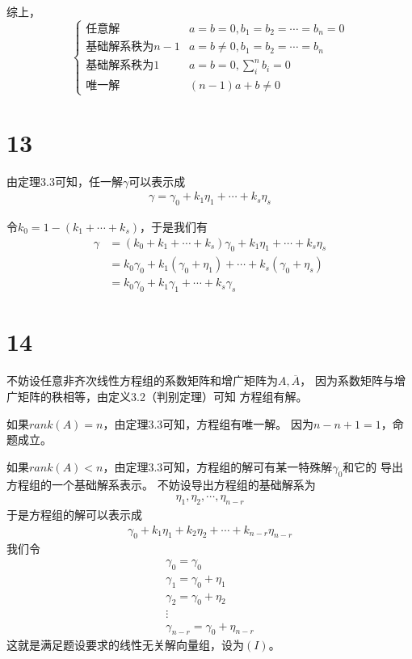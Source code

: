 \documentclass{article}
\begin{document}
综上，
\begin{equation*}
  \begin{cases}
    \text{任意解}           & a = b = 0, b_1 = b_2 =\cdots = b_n = 0 \\
    \text{基础解系秩为$n - 1$} & a = b \neq 0, b_1 = b_2 =\cdots = b_n  \\
    \text{基础解系秩为$1$}     & a = b = 0, \sum\limits_{i}^n b_i = 0   \\
    \text{唯一解}           & (n - 1)a + b \neq 0
  \end{cases}
\end{equation*}

\section*{13}
由定理3.3可知，任一解$\gamma$可以表示成
\begin{align*}
  \gamma = \gamma_0 + k_1\eta_1 + \cdots + k_s\eta_s
\end{align*}

令$k_0 = 1 - (k_1 + \cdots + k_s)$，于是我们有
\begin{align*}
  \gamma
   & = (k_0 + k_1 + \cdots + k_s) \gamma_0 + k_1 \eta_1 + \cdots + k_s \eta_s    \\
   & = k_0 \gamma_0 + k_1 (\gamma_0 + \eta_1) + \cdots + k_s (\gamma_0 + \eta_s) \\
   & = k_0 \gamma_0 + k_1 \gamma_1 + \cdots + k_s \gamma_s
\end{align*}

\section*{14}

不妨设任意非齐次线性方程组的系数矩阵和增广矩阵为$A, \overline{A}$，
因为系数矩阵与增广矩阵的秩相等，由定义3.2（判别定理）可知
方程组有解。

如果$rank(A) = n$，由定理3.3可知，方程组有唯一解。
因为$n - n + 1 = 1$，命题成立。

如果$rank(A) < n$，由定理3.3可知，方程组的解可有某一特殊解$\gamma_0$和它的
导出方程组的一个基础解系表示。
不妨设导出方程组的基础解系为
\begin{align*}
  \eta_1, \eta_2, \cdots, \eta_{n - r}
\end{align*}
于是方程组的解可以表示成
\begin{align*}
  \gamma_0 + k_1 \eta_1 + k_2 \eta_2 + \cdots + k_{n - r} \eta_{n - r}
\end{align*}
我们令
\begin{align*}
  \gamma_0 = \gamma_0          \\
  \gamma_1 = \gamma_0 + \eta_1 \\
  \gamma_2 = \gamma_0 + \eta_2 \\
  \vdots                       \\
  \gamma_{n - r} = \gamma_0 + \eta_{n - r}
\end{align*}
这就是满足题设要求的线性无关解向量组，设为$(I)$。
\end{document}
